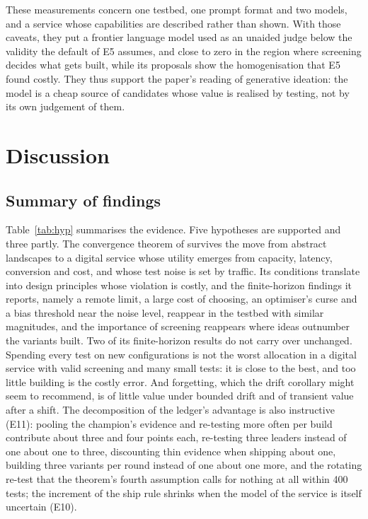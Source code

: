 \documentclass[preprint,12pt,authoryear]{elsarticle}
\theoremstyle{definition}
\begin{document}
These measurements concern one testbed, one prompt format and two models, and a service whose capabilities are described rather than shown. With those caveats, they put a frontier language model used as an unaided judge below the validity the default of E5 assumes, and close to zero in the region where screening decides what gets built, while its proposals show the homogenisation that E5 found costly. They thus support the paper's reading of generative ideation: the model is a cheap source of candidates whose value is realised by testing, not by its own judgement of them.


\section{Discussion}
\label{sec:discussion}

\subsection{Summary of findings}

Table~\ref{tab:hyp} summarises the evidence. Five hypotheses are supported and three partly. The convergence theorem of \citet{kuras2026} survives the move from abstract landscapes to a digital service whose utility emerges from capacity, latency, conversion and cost, and whose test noise is set by traffic. Its conditions translate into design principles whose violation is costly, and the finite-horizon findings it reports, namely a remote limit, a large cost of choosing, an optimiser's curse and a bias threshold near the noise level, reappear in the testbed with similar magnitudes, and the importance of screening reappears where ideas outnumber the variants built. Two of its finite-horizon results do not carry over unchanged. Spending every test on new configurations is not the worst allocation in a digital service with valid screening and many small tests: it is close to the best, and too little building is the costly error. And forgetting, which the drift corollary might seem to recommend, is of little value under bounded drift and of transient value after a shift. The decomposition of the ledger's advantage is also instructive (E11): pooling the champion's evidence and re-testing more often per build contribute about three and four points each, re-testing three leaders instead of one about one to three, discounting thin evidence when shipping about one, building three variants per round instead of one about one more, and the rotating re-test that the theorem's fourth assumption calls for nothing at all within 400 tests; the increment of the ship rule shrinks when the model of the service is itself uncertain (E10).
\end{document}
